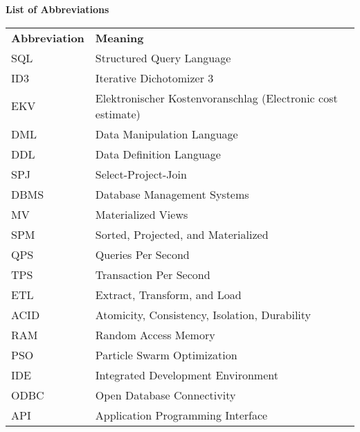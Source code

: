 
% 
\thispagestyle{empty}
\begin{center}
    \huge\textbf{List of Abbreviations}
\end{center}  \vspace{.4cm}

\noindent %

\begin{minipage}{\textwidth}
\begin{tabular}{ll}
    \textbf{Abbreviation} & \textbf{Meaning}\\
    SQL & Structured Query Language\\
    ID3 & Iterative  Dichotomizer 3\\
    EKV & Elektronischer Kostenvoranschlag (Electronic cost estimate)\\
    DML & Data Manipulation Language \\
    DDL & Data Definition Language \\
    SPJ & Select-Project-Join \\
    DBMS & Database Management Systems \\
    MV & {Materialized Views} \\
    SPM & Sorted, Projected, and Materialized \\
    QPS & Queries Per Second \\
    TPS & Transaction Per Second \\
    ETL & Extract, Transform, and Load \\
    ACID & Atomicity, Consistency, Isolation, Durability \\
    RAM & Random Access Memory \\
    PSO & Particle Swarm Optimization \\
    IDE & Integrated Development Environment\\
    ODBC & Open Database Connectivity\\
    API & Application Programming Interface\\

\end{tabular}
\end{minipage}

% 

    